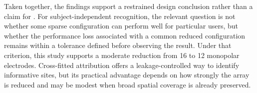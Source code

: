 Taken together, the findings support a restrained design conclusion rather than a claim for . For subject-independent recognition, the relevant question is not whether some sparse configuration can perform well for particular users, but whether the performance loss associated with a common reduced configuration remains within a tolerance defined before observing the result. Under that criterion, this study supports a moderate reduction from 16 to 12 monopolar electrodes. Cross-fitted attribution offers a leakage-controlled way to identify informative sites, but its practical advantage depends on how strongly the array is reduced and may be modest when broad spatial coverage is already preserved.
